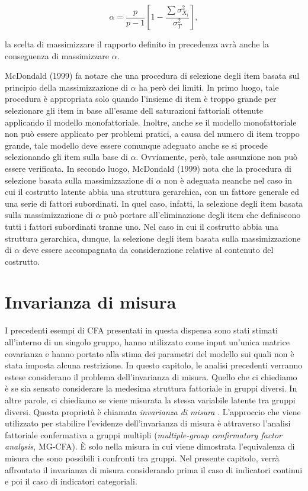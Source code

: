 \documentclass[
  11pt,
]{krantz}
\theoremstyle{definition}
\theoremstyle{definition}
\theoremstyle{definition}
\theoremstyle{definition}
\theoremstyle{remark}
\begin{document}
\[\alpha = \frac{p}{p-1}\left[1- \frac{\sum \sigma^2_{X_i}}{\sigma^2_T} \right],\]

la scelta di massimizzare il rapporto definito in precedenza avrà anche la conseguenza di massimizzare \(\alpha\).

McDondald (1999) fa notare che una procedura di selezione degli item basata sul principio della massimizzazione di \(\alpha\) ha però dei limiti. In primo luogo, tale procedura è appropriata solo quando l'insieme di item è troppo grande per selezionare gli item in base all'esame dell saturazioni fattoriali ottenute applicando il modello monofattoriale. Inoltre, anche se il modello monofattoriale non può essere applicato per problemi pratici, a causa del numero di item troppo grande, tale modello deve essere comunque adeguato anche se si procede selezionando gli item sulla base di \(\alpha\). Ovviamente, però, tale assunzione non può essere verificata. In secondo luogo, McDondald (1999) nota che la procedura di selezione basata sulla massimizzazione di \(\alpha\) non è adeguata neanche nel caso in cui il costrutto latente abbia una struttura gerarchica, con un fattore generale ed una serie di fattori subordinati. In quel caso, infatti, la selezione degli item basata sulla massimizzazione di \(\alpha\) può portare all'eliminazione degli item che definiscono tutti i fattori subordinati tranne uno. Nel caso in cui il costrutto abbia una struttura gerarchica, dunque, la selezione degli item basata sulla massimizzazione di \(\alpha\) deve essere accompagnata da considerazione relative al contenuto del costrutto.

\hypertarget{ch:factorial-invariance}{%
\chapter{Invarianza di misura}\label{ch:factorial-invariance}}

I precedenti esempi di CFA presentati in questa dispensa sono stati stimati all'interno di un singolo gruppo, hanno utilizzato come input un'unica matrice covarianza e hanno portato alla stima dei parametri del modello sui quali non è stata imposta alcuna restrizione. In questo capitolo, le analisi precedenti verranno estese considerano il problema dell'invarianza di misura. Quello che ci chiediamo è se sia sensato considerare la medesima struttura fattoriale in gruppi diversi. In altre parole, ci chiediamo se viene misurata la stessa variabile latente tra gruppi diversi. Questa proprietà è chiamata \emph{invarianza di misura} \citep{meredith1993measurement}. L'approccio che viene utilizzato per stabilire l'evidenze dell'invarianza di misura è attraverso l'analisi fattoriale confermativa a gruppi multipli (\emph{multiple-group confirmatory factor analysis}, MG-CFA). È solo nella misura in cui viene dimostrata l'equivalenza di misura che sono possibili i confronti tra gruppi. Nel presente capitolo, verrà affrontato il invarianza di misura considerando prima il caso di indicatori continui e poi il caso di indicatori categoriali.
\end{document}
